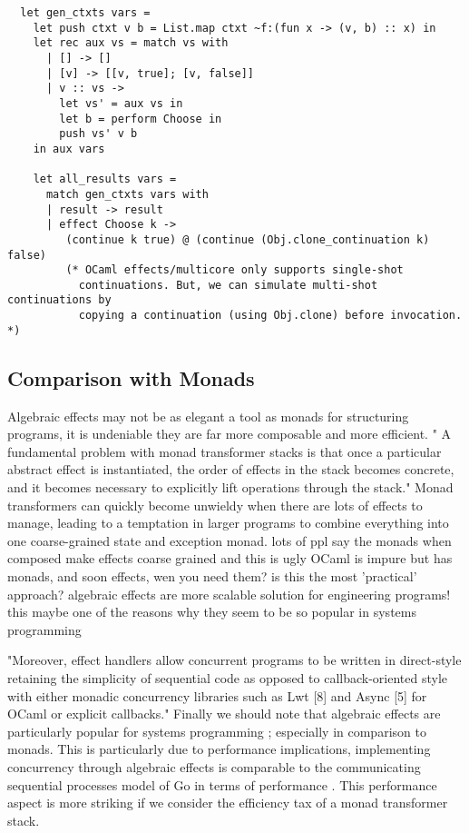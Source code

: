 \begin{verbatim}
  let gen_ctxts vars =
    let push ctxt v b = List.map ctxt ~f:(fun x -> (v, b) :: x) in
    let rec aux vs = match vs with
      | [] -> []
      | [v] -> [[v, true]; [v, false]]
      | v :: vs ->
        let vs' = aux vs in
        let b = perform Choose in
        push vs' v b
    in aux vars

    let all_results vars =
      match gen_ctxts vars with
      | result -> result
      | effect Choose k ->
         (continue k true) @ (continue (Obj.clone_continuation k) false)
         (* OCaml effects/multicore only supports single-shot
           continuations. But, we can simulate multi-shot continuations by
           copying a continuation (using Obj.clone) before invocation. *)
\end{verbatim}

\subsection{Comparison with Monads}
Algebraic effects may not be as elegant a tool as monads
for structuring programs,
it is undeniable they are far more composable
and more efficient.
"
A fundamental problem with monad transformer stacks is that
once a particular abstract effect is instantiated,
the order of effects in the stack becomes concrete,
and it becomes necessary to explicitly lift operations
through the stack."
\cite{kammar2013handlers}
Monad transformers can quickly become unwieldy when there are lots of effects to manage,
leading to a temptation in larger programs to combine everything into one coarse-grained state and exception monad.
\cite{brady2013programming}
lots of ppl say the monads when composed make effects coarse grained
and this is ugly
OCaml is impure but has monads, and soon effects, wen you need them?
is this the most 'practical' approach?
algebraic effects are more scalable solution for engineering programs!
this maybe one of the reasons why they seem to be so popular in systems
programming


"Moreover, effect handlers allow concurrent programs to be written in direct-style retaining the simplicity of sequential code as opposed to callback-oriented style with either monadic concurrency libraries such as Lwt [8] and Async [5] for OCaml or explicit callbacks."
\cite{dolaneffectively}
Finally we should note that
algebraic effects are particularly popular for systems programming
\cite{dolan2015effective, dolan2017concurrent, dolaneffectively};
especially in comparison to monads.
This is particularly due to performance implications,
implementing concurrency through algebraic effects
is comparable to the communicating sequential processes model
of Go in terms of performance \cite{Dolan:2017}.
This performance aspect is more striking
if we consider the efficiency tax of a monad
transformer stack\cite{o2008real}.

